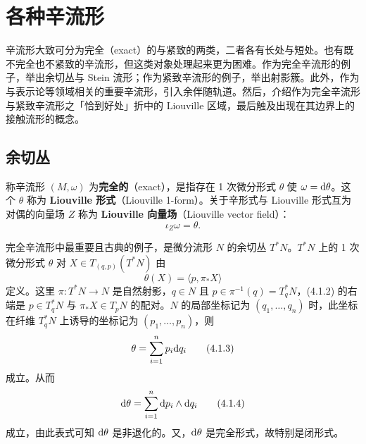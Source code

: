 
\chapter{各种辛流形}

辛流形大致可分为完全（exact）的与紧致的两类，二者各有长处与短处。也有既不完全也不紧致的辛流形，但这类对象处理起来更为困难。作为完全辛流形的例子，举出余切丛与 Stein 流形；作为紧致辛流形的例子，举出射影簇。此外，作为与表示论等领域相关的重要辛流形，引入余伴随轨道。然后，介绍作为完全辛流形与紧致辛流形之「恰到好处」折中的 Liouville 区域，最后触及出现在其边界上的接触流形的概念。


\section{余切丛}

称辛流形 $(M,\omega)$ 为\textbf{完全的}（exact），是指存在 1 次微分形式 $\theta$ 使 $\omega = \mathrm{d}\theta$。这个 $\theta$ 称为 \textbf{Liouville 形式}（Liouville 1-form）。关于辛形式与 Liouville 形式互为对偶的向量场 $Z$ 称为 \textbf{Liouville 向量场}（Liouville vector field）：
\begin{equation}
  \iota_Z\omega = \theta.
  \tag{4.1.1}
\end{equation}

完全辛流形中最重要且古典的例子，是微分流形 $N$ 的余切丛 $T^*N$。$T^*N$ 上的 1 次微分形式 $\theta$ 对 $X\in T_{(q,p)}(T^*N)$ 由
\begin{equation}
  \theta(X) = \langle p,\pi_*X\rangle
  \tag{4.1.2}
\end{equation}
定义。这里 $\pi\colon T^*N\to N$ 是自然射影，$q\in N$ 且 $p\in\pi^{-1}(q) = T^*_qN$，(4.1.2) 的右端是 $p\in T^*_qN$ 与 $\pi_*X\in T_pN$ 的配对。$N$ 的局部坐标记为 $(q_1,\dots,q_n)$ 时，此坐标在纤维 $T^*_qN$ 上诱导的坐标记为 $(p_1,\dots,p_n)$，则
\begin{equation}
  \theta = \sum_{i=1}^{n}p_i\mathrm{d} q_i
  \tag{4.1.3}
\end{equation}
成立。从而
\begin{equation}
  \mathrm{d}\theta = \sum_{i=1}^{n}\mathrm{d} p_i\wedge\mathrm{d} q_i
  \tag{4.1.4}
\end{equation}
成立，由此表式可知 $\mathrm{d}\theta$ 是非退化的。又，$\mathrm{d}\theta$ 是完全形式，故特别是闭形式。

